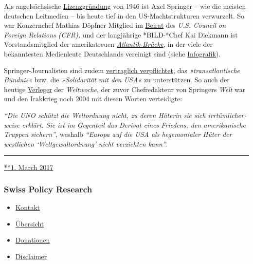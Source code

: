 Als angel­säch­sische
\href{https://de.wikipedia.org/wiki/Lizenzzeitung}{Li­zenz­grün­dung}
von 1946 ist Axel Springer -- wie die meisten deutschen Leit­medien --
bis heute tief in den US-Macht­­struk­turen ver­wur­zelt. So war
Konzern­­chef Mathias Döpfner Mit­glied im
\href{https://www.cfr.org/global-board-advisors}{Bei­rat} des \emph{U.S.
Council on Foreign Relations (CFR),} und der lang­jährige *BILD-*​Chef
Kai Diek­­mann ist Vor­stands­mitglied der ame­ri­ka­treuen
\emph{\href{https://de.wikipedia.org/wiki/Atlantik-Br\%C3\%BCcke}{Atlantik-Brücke},}
in der viele der bekanntesten Medien­leute Deutsch­lands ver­ei­nigt
sind (siehe
\href{https://swprs.org/netzwerk-medien-deutschland/}{Infografik}).

Springer-Journa­listen sind zudem
\href{https://bildblog.de/89290/axel-springer-gibt-sich-neue-alte-grundsaetze/}{ver­­trag­­lich
ver­pfli­ch­tet}, das \emph{»trans­at­lantische Bündnis«} bzw. die
\emph{»Soli­da­rität mit den USA«} zu unter­stützen. So auch der heutige
\href{https://de.wikipedia.org/wiki/Roger_K\%C3\%B6ppel}{Ver­leger} der
\emph{Welt­woche}, der zuvor Chef­re­dakteur von Springers \emph{Welt}
war und den Irak­krieg noch 2004 mit diesen Worten ver­tei­digte:

\emph{``Die UNO schützt die Welt­ordnung nicht, zu deren Hüterin sie
sich irr­tüm­licher­weise erklärt. Sie ist im Gegen­teil das Derivat
eines Friedens, den ameri­ka­nische Truppen sichern'',} weshalb
\emph{``Europa auf die USA als hege­mon­ialer Hüter der west­lichen
`Welt­gewalt­ordnung' nicht ver­zichten kann''.}

\begin{center}\rule{0.5\linewidth}{\linethickness}\end{center}

\href{https://swprs.org/2017/03/01/eine-bruecke-ueber-den-atlantik/}{**1.
March 2017}

\hypertarget{swiss-policy-research}{%
\subsubsection{Swiss Policy Research}\label{swiss-policy-research}}

\begin{itemize}
\tightlist
\item
  \href{https://swprs.org/kontakt/}{Kontakt}
\item
  \href{https://swprs.org/uebersicht/}{Übersicht}
\item
  \href{https://swprs.org/donationen/}{Donationen}
\item
  \href{https://swprs.org/disclaimer/}{Disclaimer}
\end{itemize}

